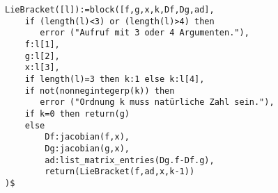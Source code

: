 \noindent
\begin{minipage}[t]{\textwidth}
\color{blue}
\begin{verbatim}
LieBracket([l]):=block([f,g,x,k,Df,Dg,ad],
    if (length(l)<3) or (length(l)>4) then 
       error ("Aufruf mit 3 oder 4 Argumenten."),
    f:l[1],
    g:l[2],
    x:l[3],
    if length(l)=3 then k:1 else k:l[4],
    if not(nonnegintegerp(k)) then 
       error ("Ordnung k muss natürliche Zahl sein."),
    if k=0 then return(g)
    else 
        Df:jacobian(f,x),
        Dg:jacobian(g,x),
        ad:list_matrix_entries(Dg.f-Df.g),
        return(LieBracket(f,ad,x,k-1))
)$
\end{verbatim}
\end{minipage}
